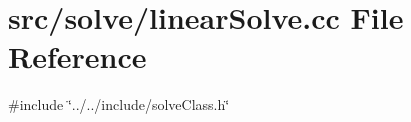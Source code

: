 \section{src/solve/linear\+Solve.cc File Reference}
\label{linear_solve_8cc}
{\ttfamily \#include \char`\"{}../../include/solve\+Class.\+h\char`\"{}}\newline
